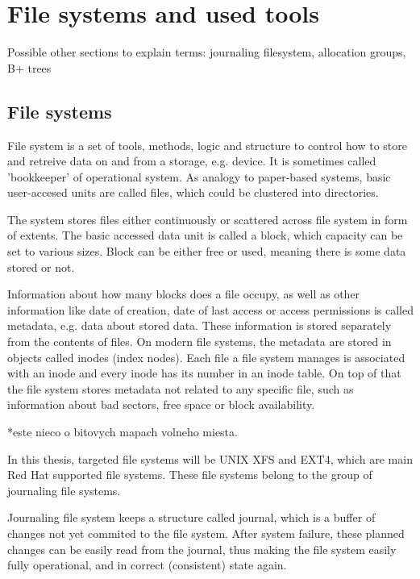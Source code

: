 \documentclass[
  color, %
  table, %
  lof,   %
  lot,   %
]{fithesis3}
\begin{document}
\chapter{File systems and used tools}
Possible other sections to explain terms: journaling filesystem, allocation groups, B+ trees
\section{File systems}
File system is a set of tools, methods, logic and structure to control how to store and retreive data on and from a storage, e.g. device. It is sometimes called 'bookkeeper' of operational system. As analogy to paper-based systems, basic user-accesed units are called files, which could be clustered into directories.

The system stores files either continuously or scattered across file system in form of extents. The basic accessed data unit is called a block, which capacity can be set to various sizes. Block can be either free or used, meaning there is some data stored or not.

Information about how many blocks does a file occupy, as well as other information like date of creation, date of last access or access permissions is called metadata, e.g. data about stored data. These information is stored separately from the contents of files. On modern file systems, the metadata are stored in objects called inodes (index nodes). Each file a file system manages is associated with an inode and every inode has its number in an inode table. On top of that the file system stores metadata not related to any specific file, such as information about bad sectors, free space or block availability.


*este nieco o bitovych mapach volneho miesta.

In this thesis, targeted file systems will be UNIX XFS and EXT4, which are main Red Hat supported file systems. These file systems belong to the group of journaling file systems.

Journaling file system keeps a structure called journal, which is a buffer of changes not yet commited to the file system. After system failure, these planned changes can be easily read from the journal, thus making the file system easily fully operational, and in correct (consistent) state again.
\end{document}
